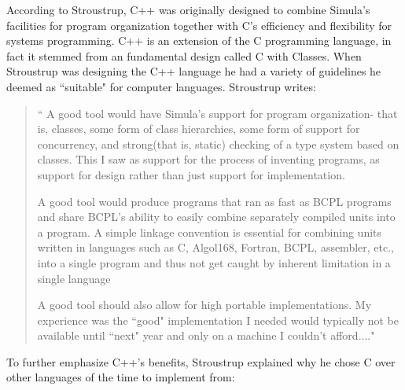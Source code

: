 According to Stroustrup, C++ was originally designed to combine Simula's facilities for program organization together with C's efficiency and flexibility for systems programming\cite{stroustrup1996history}.  C++ is an extension of the C programming language, in fact it stemmed from an fundamental design called C with Classes\cite{stroustrup1996history}.  When Stroustrup was designing the C++ language he had a variety of guidelines he deemed as ``suitable" for computer languages.  Stroustrup writes:
\begin{quote}
\label{qt: StroustrupC++History}
\begin{enumerate}[label = {[\arabic*]}]
\item `` A good tool would have Simula's support for program organization- that is, classes, some form of class hierarchies, some form of support for concurrency, and strong(that is, static) checking of a type system based on classes.  This I saw as support for the process of inventing programs, as support for design rather than just support for implementation.

 \item A good tool would produce programs that ran as fast as BCPL programs and share BCPL's ability to easily combine separately compiled units into a program.  A simple linkage convention is essential for combining units written in languages such as C, Algol168, Fortran, BCPL, assembler, etc., into a single program and thus not get caught by inherent limitation in a single language

 \item A good tool should also allow for high portable implementations.  My experience was the ``good" implementation I needed would typically not be available until ``next" year and only on a machine I couldn't afford....\cite{stroustrup1996history}"
\end{enumerate}
\end{quote}

To further emphasize C++'s benefits, Stroustrup explained why he chose C over other languages of the time to implement from:


